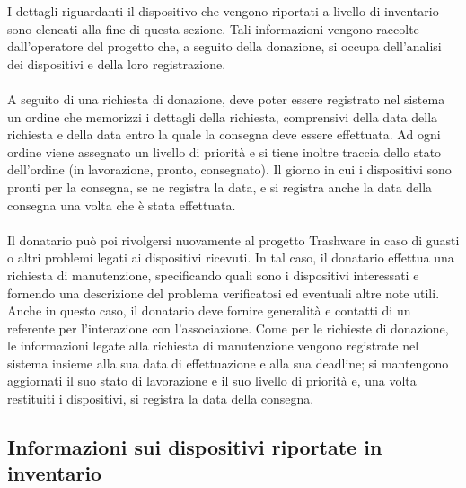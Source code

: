 \documentclass[a4paper,12pt]{report}
\begin{document}
\noindent I dettagli riguardanti il dispositivo che vengono riportati a livello di inventario sono elencati alla fine di questa sezione. Tali informazioni vengono raccolte dall'operatore del progetto che, a seguito della donazione, si occupa dell'analisi dei dispositivi e della loro registrazione. 
\\\\
A seguito di una richiesta di donazione, deve poter essere registrato nel sistema un ordine che memorizzi i dettagli della richiesta, comprensivi della data della richiesta e della data entro la quale la consegna deve essere effettuata. Ad ogni ordine viene assegnato un livello di priorità e si tiene inoltre traccia dello stato dell’ordine (in lavorazione, pronto, consegnato). Il giorno in cui i dispositivi sono pronti per la consegna, se ne registra la data, e si registra anche la data della consegna una volta che è stata effettuata.
\\\\
Il donatario può poi rivolgersi nuovamente al progetto Trashware in caso di guasti o altri problemi legati ai dispositivi ricevuti. In tal caso, il donatario effettua una richiesta di manutenzione, specificando quali sono i dispositivi interessati e fornendo una descrizione del problema verificatosi ed eventuali altre note utili. Anche in questo caso, il donatario deve fornire generalità e contatti di un referente per l'interazione con l'associazione. Come per le richieste di donazione, le informazioni legate alla richiesta di manutenzione vengono registrate nel sistema insieme alla sua data di effettuazione e alla sua deadline; si mantengono aggiornati il suo stato di lavorazione e il suo livello di priorità e, una volta restituiti i dispositivi, si registra la data della consegna.

\subsection{Informazioni sui dispositivi riportate in inventario} \label{Inventario}
\end{document}
